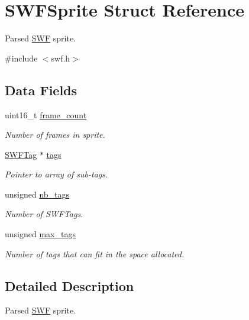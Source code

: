 \hypertarget{struct_s_w_f_sprite}{\section{S\-W\-F\-Sprite Struct Reference}
\label{struct_s_w_f_sprite}
}


Parsed \hyperlink{struct_s_w_f}{S\-W\-F} sprite.  




{\ttfamily \#include $<$swf.\-h$>$}

\subsection*{Data Fields}
\begin{DoxyCompactItemize}
\item 
uint16\-\_\-t \hyperlink{struct_s_w_f_sprite_a952578e82c9d1dad81bbb086cb8ec1c2}{frame\-\_\-count}
\begin{DoxyCompactList}\small\item\em Number of frames in sprite. \end{DoxyCompactList}\item 
\hyperlink{struct_s_w_f_tag}{S\-W\-F\-Tag} $\ast$ \hyperlink{struct_s_w_f_sprite_ade3a1182fa49e25d252ade80aac6f873}{tags}
\begin{DoxyCompactList}\small\item\em Pointer to array of sub-\/tags. \end{DoxyCompactList}\item 
unsigned \hyperlink{struct_s_w_f_sprite_a9eae389efaf36d5ebf4e1e31edf2f05e}{nb\-\_\-tags}
\begin{DoxyCompactList}\small\item\em Number of S\-W\-F\-Tags. \end{DoxyCompactList}\item 
unsigned \hyperlink{struct_s_w_f_sprite_a508a2dc2cceb78be54bf2c40a1665236}{max\-\_\-tags}
\begin{DoxyCompactList}\small\item\em Number of tags that can fit in the space allocated. \end{DoxyCompactList}\end{DoxyCompactItemize}


\subsection{Detailed Description}
Parsed \hyperlink{struct_s_w_f}{S\-W\-F} sprite. 

